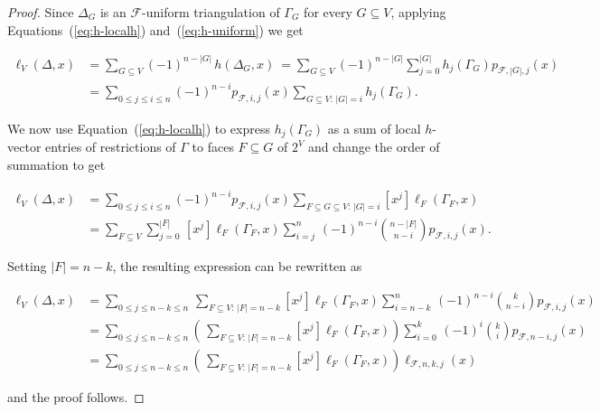 \documentclass[10pt,a4paper]{amsart}
\newcommand{\fF}{{\mathcal F}}
\begin{document}
\begin{proof}
Since $\Delta_G$ is an $\fF$-uniform triangulation
of $\Gamma_G$ for every $G \subseteq V$, applying 
Equations~(\ref{eq:h-localh}) 
and~(\ref{eq:h-uniform}) we get 

\begin{align*}
\ell_V(\Delta,x) & = \sum_{G \subseteq V} 
     (-1)^{n - |G|} \, h (\Delta_G, x) \ = 
		 \sum_{G \subseteq V} (-1)^{n - |G|} 
     \sum_{j=0}^{|G|} h_j(\Gamma_G) p_{\fF,|G|,j}(x) 
		\\ & = \sum_{0 \le j \le i \le n} (-1)^{n-i} 
		       p_{\fF,i,j}(x)
    \sum_{G \subseteq V: \, |G|=i} h_j(\Gamma_G).  
\end{align*}

\medskip
\noindent
We now use Equation~(\ref{eq:h-localh}) to express 
$h_j(\Gamma_G)$ as a sum of local $h$-vector entries 
of restrictions of $\Gamma$ to faces $F \subseteq G$
of $2^V$ and change the order of summation to get 

\begin{align*}
\ell_V(\Delta,x) & = 
\sum_{0 \le j \le i \le n} (-1)^{n-i} p_{\fF,i,j}(x)
\sum_{F \subseteq G \subseteq V: \, |G|=i} [x^j] 
      \ell_F(\Gamma_F,x) \\
			& = \sum_{F \subseteq V} \sum_{j=0}^{|F|} \,
			[x^j] \ell_F(\Gamma_F,x) 
			\sum_{i=j}^n \, (-1)^{n-i} 
			{n-|F| \choose n-i} p_{\fF,i,j}(x).
\end{align*}

\medskip
\noindent
Setting $|F| = n-k$, the resulting expression can be
rewritten as 

\begin{align*}
\ell_V(\Delta,x) & = 
\sum_{0 \le j \le n-k \le n} \,
\sum_{F \subseteq V: \, |F|=n-k} [x^j] 
                                 \ell_F(\Gamma_F,x) 
			\sum_{i=n-k}^n \, (-1)^{n-i} 
			{k \choose n-i} p_{\fF,i,j}(x) \\ & = 
\sum_{0 \le j \le n-k \le n} \left( \,
\sum_{F \subseteq V: \, |F|=n-k} [x^j] 
                     \ell_F(\Gamma_F,x) \right) 
			\sum_{i=0}^k \, (-1)^i {k \choose i} 
			p_{\fF,n-i,j}(x) \\ & = 
			\sum_{0 \le j \le n-k \le n} \left( \,
\sum_{F \subseteq V: \, |F|=n-k} [x^j] 
        \ell_F(\Gamma_F,x) \right) 
				\ell_{\fF,n,k,j}(x)
\end{align*}

\medskip
\noindent
and the proof follows.
\end{proof}
\end{document}
